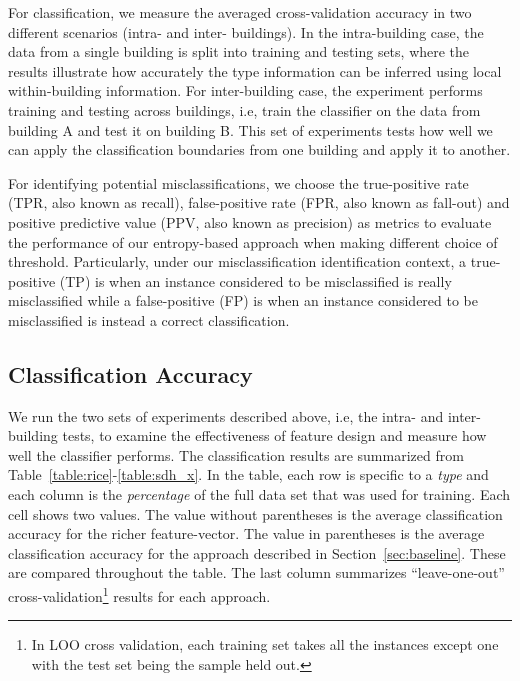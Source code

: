 For classification, we measure the averaged cross-validation accuracy in two different scenarios (intra- and inter- buildings). In the intra-building case, the 
data from a single building is split into training and testing sets, where the results illustrate how accurately the type information can be inferred using local 
within-building information. For inter-building case, the experiment performs training and testing across buildings, i.e, train the classifier on the data from building A 
and test it on building B.  
This set of experiments tests how well we can apply the classification boundaries from one building and apply it to another.

For identifying potential misclassifications, we choose the true-positive rate (TPR, also known as recall), false-positive rate (FPR, also known as fall-out) and positive predictive 
value (PPV, also known as precision) as metrics to evaluate the performance of our entropy-based approach when making different choice of threshold. Particularly, under our misclassification
identification context, a true-positive (TP) is when an instance considered to be misclassified is really misclassified while a false-positive (FP) is when an instance considered to be misclassified 
is instead a correct classification.

\subsection{Classification Accuracy}
We run the two sets of experiments described above, i.e, the intra- and inter- building tests, to examine the effectiveness of feature design and measure how well 
the classifier performs. The classification results are summarized from Table~\ref{table:rice}-\ref{table:sdh_x}. %
In the table, each row is specific to a \emph{type} and each column is the \emph{percentage} of the full data set that was used for training.
Each cell shows two values.  The value without parentheses is the average classification accuracy for the richer feature-vector. 
The value in parentheses is the average classification accuracy for the approach described in 
Section~\ref{sec:baseline}. These are compared throughout the table.
The last column summarizes ``leave-one-out'' cross-validation\footnote{In LOO cross validation, each training set takes all the instances except one with the test set being 
the sample held out.} results for each approach.

